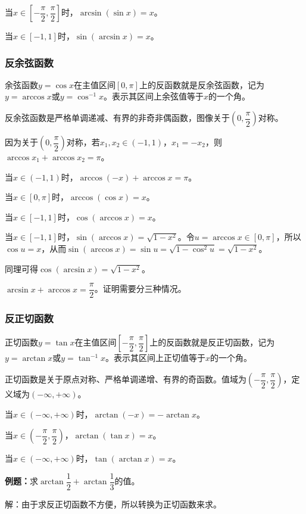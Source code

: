 当$x\in\left[-\dfrac{\pi}{2},\dfrac{\pi}{2}\right]$时，$\arcsin(\sin x)=x$。

当$x\in[-1,1]$时，$\sin(\arcsin x)=x$。

\subsubsection{反余弦函数}

余弦函数$y=\cos x$在主值区间$[0,\pi]$上的反函数就是反余弦函数，记为$y=\arccos x$或$y=\cos^{-1}x$。表示其区间上余弦值等于$x$的一个角。

反余弦函数是严格单调递减、有界的非奇非偶函数，图像关于$\left(0,\dfrac{\pi}{2}\right)$对称。

因为关于$\left(0,\dfrac{\pi}{2}\right)$对称，若$x_1,x_2\in(-1,1)$，$x_1=-x_2$，则$\arccos x_1+\arccos x_2=\pi$。

当$x\in(-1,1)$时，$\arccos(-x)+\arccos x=\pi$。

当$x\in[0,\pi]$时，$\arccos(\cos x)=x$。

当$x\in[-1,1]$时，$\cos(\arccos x)=x$。

当$x\in[-1,1]$时，$\sin(\arccos x)=\sqrt{1-x^2}$。令$u=\arccos x\in[0,\pi]$，所以$\cos u=x$，从而$\sin(\arccos x)=\sin u=\sqrt{1-\cos^2u}=\sqrt{1-x^2}$。

同理可得$\cos(\arcsin x)=\sqrt{1-x^2}$。

$\arcsin x+\arccos x=\dfrac{\pi}{2}$。证明需要分三种情况。

\subsubsection{反正切函数}

正切函数$y=\tan x$在主值区间$\left[-\dfrac{\pi}{2},\dfrac{\pi}{2}\right]$上的反函数就是反正切函数，记为$y=\arctan x$或$y=\tan^{-1}x$。表示其区间上正切值等于$x$的一个角。

正切函数是关于原点对称、严格单调递增、有界的奇函数。值域为$\left(-\dfrac{\pi}{2},\dfrac{\pi}{2}\right)$，定义域为$(-\infty,+\infty)$。

当$x\in(-\infty,+\infty)$时，$\arctan(-x)=-\arctan x$。

当$x\in\left(-\dfrac{\pi}{2},\dfrac{\pi}{2}\right)$，$\arctan(\tan x)=x$。

当$x\in(-\infty,+\infty)$时，$\tan(\arctan x)=x$。

\textbf{例题：}求$\arctan\dfrac{1}{2}+\arctan\dfrac{1}{3}$的值。

解：由于求反正切函数不方便，所以转换为正切函数来求。

